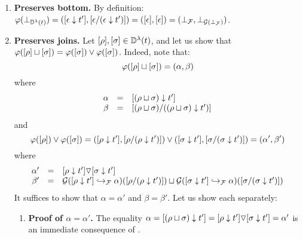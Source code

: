 \begin{enumerate}
\begin{enumerate}
\begin{enumerate}
\begin{enumerate}
      \end{enumerate}
    \item {\bf Preserves bottom.}
      By definition:
      $\varphi(\bot_{\mathbb{D}^{\lambda}(t)})
       = ({[\epsilon \downarrow t']}, {[\epsilon/(\epsilon \downarrow t')]})
       = ({[\epsilon]},{[\epsilon]})
       = (\bot_{\mathcal{F}},\bot_{\mathcal{G}(\bot_{\mathcal{F}})})$.
    \item {\bf Preserves joins.}
      Let ${[\rho]},{[\sigma]} \in \mathbb{D}^{\lambda}(t)$, and let us show that
      $\varphi({[\rho]} \sqcup {[\sigma]}) = \varphi({[\sigma]}) \lor \varphi({[\sigma]})$.
      Indeed, note that:
      \[
        \varphi({[\rho]} \sqcup {[\sigma]}) = (\alpha,\beta)
      \]
      where
      \[
        \begin{array}{rcl}
        \alpha & = & {[(\rho \sqcup \sigma) \downarrow t']} \\
        \beta  & = & {[(\rho \sqcup \sigma) / ((\rho \sqcup \sigma) \downarrow t')]} \\
        \end{array}
      \]
      and
      \[
        \varphi({[\rho]}) \lor \varphi({[\sigma]})
        = ({[\rho \downarrow t']}, {[\rho / (\rho \downarrow t')]}) \lor
          ({[\sigma \downarrow t']}, {[\sigma / (\sigma \downarrow t')]}) \\
        = (\alpha', \beta') \\
      \]
      where
      \[
        \begin{array}{rcl}
        \alpha' & = & {[\rho \downarrow t']} \triangledown {[\sigma\downarrow t']} \\
        \beta'  & = &
               \mathcal{G}({[\rho \downarrow t']} \hookrightarrow_{\mathcal{F}} \alpha)({[\rho / (\rho \downarrow t')]}) \sqcup \mathcal{G}({[\sigma \downarrow t']} \hookrightarrow_{\mathcal{F}} \alpha)({[\sigma / (\sigma \downarrow t')]})
        \end{array}
      \]
      It suffices to show that $\alpha = \alpha'$ and $\beta = \beta'$.
      Let us show each separately:
      \begin{enumerate}
      \item {\bf Proof of $\alpha = \alpha'$.}
        The equality
        $
          \alpha
          = {[(\rho \sqcup \sigma) \downarrow t']}
          = {[\rho \downarrow t']} \triangledown {[\sigma\downarrow t']}
          = \alpha'
        $
        is an immediate consequence of .

\end{enumerate}
\end{enumerate}
\end{enumerate}
\end{enumerate}
